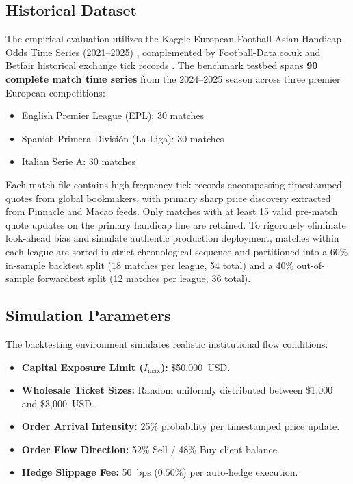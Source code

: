 \documentclass[10pt,twocolumn]{article}
\begin{document}
\subsection{Historical Dataset}

The empirical evaluation utilizes the Kaggle European Football Asian Handicap Odds Time Series (2021--2025) \cite{16}, complemented by Football-Data.co.uk \cite{17} and Betfair historical exchange tick records \cite{18}. The benchmark testbed spans \textbf{90 complete match time series} from the 2024--2025 season across three premier European competitions:
\begin{itemize}
    \item English Premier League (EPL): 30 matches
    \item Spanish Primera División (La Liga): 30 matches
    \item Italian Serie A: 30 matches
\end{itemize}
Each match file contains high-frequency tick records encompassing timestamped quotes from global bookmakers, with primary sharp price discovery extracted from Pinnacle and Macao feeds. Only matches with at least 15 valid pre-match quote updates on the primary handicap line are retained. To rigorously eliminate look-ahead bias and simulate authentic production deployment, matches within each league are sorted in strict chronological sequence and partitioned into a 60\% in-sample backtest split (18 matches per league, 54 total) and a 40\% out-of-sample forwardtest split (12 matches per league, 36 total).

\subsection{Simulation Parameters}

The backtesting environment simulates realistic institutional flow conditions:
\begin{itemize}
    \item \textbf{Capital Exposure Limit ($I_{\max}$):} \$50,000~USD.
    \item \textbf{Wholesale Ticket Sizes:} Random uniformly distributed between \$1,000 and \$3,000~USD.
    \item \textbf{Order Arrival Intensity:} 25\% probability per timestamped price update.
    \item \textbf{Order Flow Direction:} 52\% Sell / 48\% Buy client balance.
    \item \textbf{Hedge Slippage Fee:} 50~bps ($0.50\%$) per auto-hedge execution.
\end{itemize}
\end{document}
